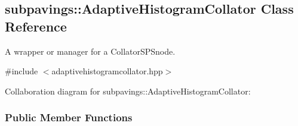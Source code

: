\hypertarget{classsubpavings_1_1AdaptiveHistogramCollator}{\subsection{subpavings\-:\-:\-Adaptive\-Histogram\-Collator \-Class \-Reference}
\label{classsubpavings_1_1AdaptiveHistogramCollator}
}


\-A wrapper or manager for a \-Collator\-S\-P\-Snode.  




{\ttfamily \#include $<$adaptivehistogramcollator.\-hpp$>$}



\-Collaboration diagram for subpavings\-:\-:\-Adaptive\-Histogram\-Collator\-:
\subsubsection*{\-Public \-Member \-Functions}
